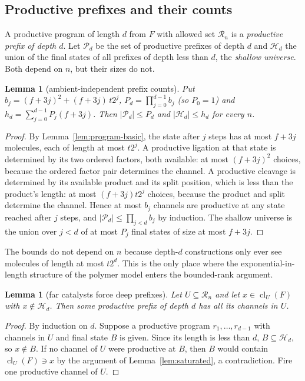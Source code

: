 \documentclass[11pt,a4paper]{article}
\theoremstyle{plain}
\newtheorem{lemma}[theorem]{Lemma}
\theoremstyle{definition}
\theoremstyle{remark}
\newcommand{\cl}{\operatorname{cl}}
\newcommand{\cR}{\mathcal R}
\newcommand{\cP}{\mathcal P}
\newcommand{\cH}{\mathcal H}
\begin{document}
\subsection{Productive prefixes and their counts}

A productive program of length $d$ from $F$ with allowed set $\cR_n$ is a \emph{productive prefix of depth $d$}. Let $\cP_d$ be the set of productive prefixes of depth $d$ and $\cH_d$ the union of the final states of all prefixes of depth less than $d$, the \emph{shallow universe}. Both depend on $n$, but their sizes do not.

\begin{lemma}[ambient-independent prefix counts]\label{lem:prefix}
Put $b_j=(f+3j)^2+(f+3j)\,t2^j$, $P_d=\prod_{j=0}^{d-1}b_j$ (so $P_0=1$) and $h_d=\sum_{j=0}^{d-1}P_j(f+3j)$. Then $|\cP_d|\le P_d$ and $|\cH_d|\le h_d$ for every $n$.
\end{lemma}

\begin{proof}
By Lemma~\ref{lem:program-basic}, the state after $j$ steps has at most $f+3j$ molecules, each of length at most $t2^j$. A productive ligation at that state is determined by its two ordered factors, both available: at most $(f+3j)^2$ choices, because the ordered factor pair determines the channel. A productive cleavage is determined by its available product and its split position, which is less than the product's length: at most $(f+3j)t2^j$ choices, because the product and split determine the channel. Hence at most $b_j$ channels are productive at any state reached after $j$ steps, and $|\cP_d|\le\prod_{j<d}b_j$ by induction. The shallow universe is the union over $j<d$ of at most $P_j$ final states of size at most $f+3j$.
\end{proof}

The bounds do not depend on $n$ because depth-$d$ constructions only ever see molecules of length at most $t2^d$. This is the only place where the exponential-in-length structure of the polymer model enters the bounded-rank argument.

\begin{lemma}[far catalysts force deep prefixes]\label{lem:far}
Let $U\subseteq\cR_n$ and let $x\in\cl_U(F)$ with $x\notin\cH_d$. Then some productive prefix of depth $d$ has all its channels in $U$.
\end{lemma}

\begin{proof}
By induction on $d$. Suppose a productive program $r_1,\dots,r_{d-1}$ with channels in $U$ and final state $B$ is given. Since its length is less than $d$, $B\subseteq\cH_d$, so $x\notin B$. If no channel of $U$ were productive at $B$, then $B$ would contain $\cl_U(F)\ni x$ by the argument of Lemma~\ref{lem:saturated}, a contradiction. Fire one productive channel of $U$.
\end{proof}
\end{document}
